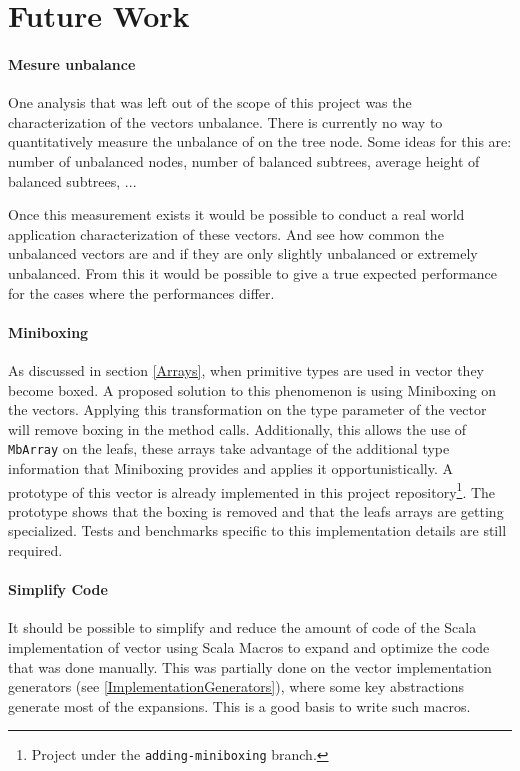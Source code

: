 \section{Future Work}

\paragraph{Mesure unbalance}
One analysis that was left out of the scope of this project was the characterization of the vectors unbalance. There is currently no way to quantitatively measure the unbalance of on the tree node. Some ideas for this are: number of unbalanced nodes, number of balanced subtrees, average height of balanced subtrees, ... 

Once this measurement exists it would be possible to conduct a real world application characterization of these vectors. And see how common the unbalanced vectors are and if they are only slightly unbalanced or extremely unbalanced. From this it would be possible to give a true expected performance for the cases where the performances differ.

\paragraph{Miniboxing}
As discussed in section \ref{Arrays}, when primitive types are used in vector they become boxed. A proposed solution to this phenomenon is using Miniboxing \cite{Ureche:2013:MIS:2509136.2509537,  EPFL-REPORT-200245} on the vectors. Applying this transformation on the type parameter of the vector will remove boxing in the method calls. Additionally, this allows the use of \texttt{MbArray} on the leafs, these arrays take advantage of the additional type information that Miniboxing provides and applies it opportunistically. A prototype of this vector is already implemented in this project repository\footnote{Project \cite{projecRepo} under the \texttt{adding-miniboxing} branch.}. The prototype shows that the boxing is removed and that the leafs arrays are getting specialized. Tests and benchmarks specific to this implementation details are still required.


\paragraph{Simplify Code}
It should be possible to simplify and reduce the amount of code of the Scala implementation of vector using Scala Macros \cite{EPFL-CONF-186844}  to expand and optimize the code that was done manually. This was partially done on the vector implementation generators (see \ref{ImplementationGenerators}), where some key abstractions generate most of the expansions. This is a good basis to write such macros.

